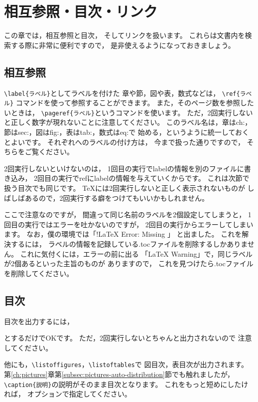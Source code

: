 \chapter{相互参照・目次・リンク}
\label{ch:references-contents-link}

この章では，相互参照と目次，
そしてリンクを扱います。
これらは文書内を検索する際に非常に便利ですので，
是非使えるようになっておきましょう。



\section{相互参照}
\label{sec:references}

\verb|\label{ラベル}|としてラベルを付けた
章や節，図や表，数式などは，
\verb|\ref{ラベル}| コマンドを使って参照することができます。
また，そのページ数を参照したいときは，
\verb|\pageref{ラベル}|というコマンドを使います。
ただ，2回実行しないと正しく数字が現れないことに注意してください。
このラベル名は，章はch:，節はsec:，図はfig:，表はtab:，数式はeq:で
始める，というように統一しておくとよいです。
それぞれへのラベルの付け方は，
今まで扱った通りですので，
そちらをご覧ください。

2回実行しないといけないのは，
1回目の実行でlabelの情報を別のファイルに書き込み，
2回目の実行でrefにlabelの情報を与えていくからです。
これは次節で扱う目次でも同じです。
{\TeX}には2回実行しないと正しく表示されないものが
しばしばあるので，2回実行する癖をつけてもいいかもしれません。

ここで注意なのですが，
間違って同じ名前のラベルを2個設定してしまうと，
1回目の実行ではエラーを吐かないのですが，
2回目の実行からエラーしてしまいます。
なお，僕の環境では「!LaTeX Error: Missing \verb||」
と出ました。
これを解決するには，
ラベルの情報を記録している.tocファイルを削除するしかありません。
これに気付くには，エラーの前に出る
「LaTeX Warning」で，同じラベルが2個あるといった主旨のものが
ありますので，
これを見つけたら.tocファイルを削除してください。



\section{目次}
目次を出力するには，
\begin{ITeX}
\tableofcontents
\end{ITeX}
とするだけでOKです。
ただ，2回実行しないとちゃんと出力されないので
注意してください。

他にも，\verb|\listoffigures|，\verb|\listoftables|で
図目次，表目次が出力されます。
第\ref{ch:pictures}章第\ref{subsec:pictures-auto-distribution}節でも触れましたが，
\verb|\caption{説明}|の説明がそのまま目次となります。
これをもっと短めにしたければ，
オプションで指定してください。

